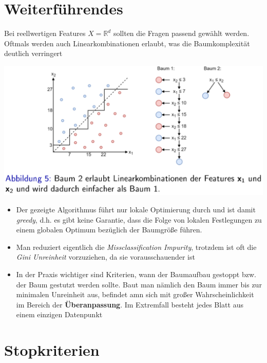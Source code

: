 \documentclass{report}
\begin{document}
\section{Weiterführendes}

Bei reellwertigen Features $X = \mathbb{R}^d$ sollten die Fragen passend gewählt werden. Oftmals werden auch
Linearkombinationen erlaubt, was die Baumkomplexität deutlich verringert

\begin{center}
  \includegraphics[scale=.3]{ml07_25}
\end{center}

\vspace*{-1.5em}
\begin{itemize}
  \item Der gezeigte Algorithmus führt nur lokale Optimierung durch und ist damit \textit{greedy}, d.h. es gibt keine Garantie,
  dass die Folge von lokalen Festlegungen zu einem globalen Optimum bezüglich der Baumgröße führen.
  \item Man reduziert eigentlich die \textit{Missclassification Impurity}, trotzdem ist oft die \textit{Gini Unreinheit}
  vorzuziehen, da sie vorausschauender ist
  \item In der Praxis wichtiger sind Kriterien, wann der Baumaufbau gestoppt bzw. der Baum gestutzt werden sollte. Baut
  man nämlich den Baum immer bis zur minimalen Unreinheit aus, befindet amn sich mit großer Wahrscheinlichkeit im
  Bereich der \textbf{Überanpassung}. Im Extremfall besteht jedes Blatt aus einem einzigen Datenpunkt
\end{itemize}

\section{Stopkriterien}
\end{document}
